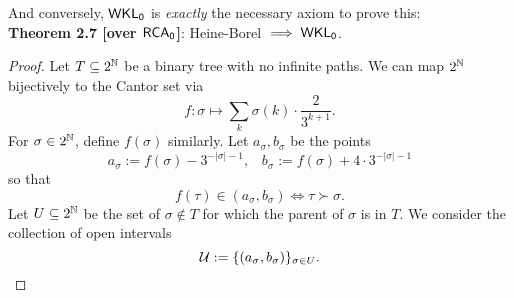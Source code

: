 \documentclass{amsart}
\begin{document}
	And conversely, $\operatorname{\sf{WKL_0}}$ is \textit{exactly} the necessary axiom to prove this:\\
	
	\noindent \textbf{Theorem 2.7 [over $\operatorname{\sf{RCA_0}}$]}: Heine-Borel $\implies \operatorname{\sf{WKL_0}}$.
	\begin{proof}
		Let $T\subseteq 2^{\mathbb{N}}$ be a binary tree with no infinite paths. We can map $2^{\mathbb{N}}$ bijectively to the Cantor set via
		$$
		f:\sigma \mapsto \sum_{k} \sigma(k)\cdot \frac{2}{3^{k+1}}.
		$$
		For $\sigma\in 2^{\mathbb{N}}$, define $f(\sigma)$ similarly. Let $a_{\sigma},b_{\sigma}$ be the points 
		$$
		a_{\sigma} := f(\sigma) - 3^{-|\sigma|-1}, \;\;\; b_{\sigma} := f(\sigma) + 4\cdot 3^{-|\sigma|-1}
		$$
		so that 
		$$f(\tau) \in (a_{\sigma},b_{\sigma}) \iff \tau\succ \sigma.$$ 
		Let $U\subseteq 2^{\mathbb{N}}$ be the set of $\sigma\not\in T$ for which the parent of $\sigma$ is in $T$. We consider the collection of open intervals
		$$
		\mathcal{U} := \{(a_{\sigma},b_{\sigma})\}_{\sigma\in U}.
		$$
		
%			
%			
%			
%			
%			
%			
%			
%			
%			
%			
		

\end{proof}
\end{document}
